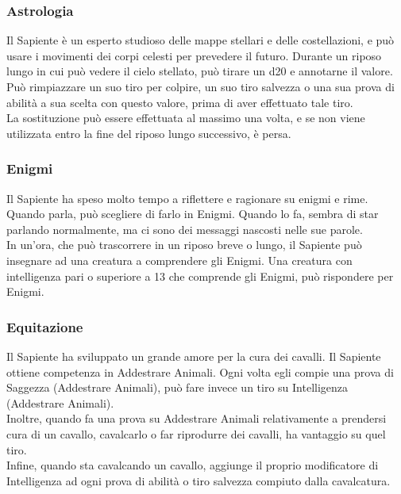 \subsubsection{Astrologia}
Il Sapiente è un esperto studioso delle mappe stellari e delle costellazioni, e può usare i movimenti dei corpi celesti per prevedere il futuro. Durante un riposo lungo in cui può vedere il cielo stellato, può tirare un d20 e annotarne il valore. Può rimpiazzare un suo tiro per colpire, un suo tiro salvezza o una sua prova di abilità a sua scelta con questo valore, prima di aver effettuato tale tiro.\\
La sostituzione può essere effettuata al massimo una volta, e se non viene utilizzata entro la fine del riposo lungo successivo, è persa.

\subsubsection{Enigmi}
Il Sapiente ha speso molto tempo a riflettere e ragionare su enigmi e rime. Quando parla, può scegliere di farlo in Enigmi. Quando lo fa, sembra di star parlando normalmente, ma ci sono dei messaggi nascosti nelle sue parole. \\
In un'ora, che può trascorrere in un riposo breve o lungo, il Sapiente può insegnare ad una creatura a comprendere gli Enigmi. Una creatura con intelligenza pari o superiore a 13 che comprende gli Enigmi, può rispondere per Enigmi.

\subsubsection{Equitazione}
Il Sapiente ha sviluppato un grande amore per la cura dei cavalli. Il Sapiente ottiene competenza in Addestrare Animali. Ogni volta egli compie una prova di Saggezza (Addestrare Animali), può fare invece un tiro su Intelligenza (Addestrare Animali).\\
Inoltre, quando fa una prova su Addestrare Animali relativamente a prendersi cura di un cavallo, cavalcarlo o far riprodurre dei cavalli, ha vantaggio su quel tiro.\\
Infine, quando sta cavalcando un cavallo, aggiunge il proprio modificatore di Intelligenza ad ogni prova di abilità o tiro salvezza compiuto dalla cavalcatura.

